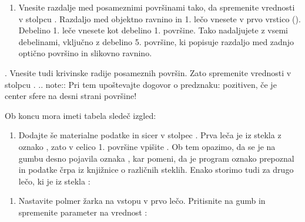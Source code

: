 \documentclass[letterpaper,10pt,english]{sphinxmanual}
\begin{document}
\begin{figure}[htbp]
\centering

\noindent{}
\end{figure}
\begin{enumerate}
%
\setcounter{enumi}{3}
\item {} 
\sphinxAtStartPar
Vnesite razdalje med posameznimi površinami tako, da spremenite vrednosti v stolpcu . Razdaljo med objektno ravnino in 1. lečo vnesete v prvo vrstico (). Debelino 1. leče vnesete kot debelino 1. površine. Tako nadaljujete z vsemi debelinami, vključno z debelino 5. površine, ki popisuje razdaljo med zadnjo optično površino in slikovno ravnino.

\end{enumerate}

. Vnesite tudi krivinske radije posameznih površin. Zato spremenite vrednosti v stolpcu .
.. note::
Pri tem upoštevajte dogovor o predznaku: pozitiven, če je center sfere na desni strani površine!

\sphinxAtStartPar
Ob koncu mora imeti tabela sledeč izgled:

\begin{figure}[htbp]
\centering

\noindent{}
\end{figure}
\begin{enumerate}
%
\setcounter{enumi}{5}
\item {} 
\sphinxAtStartPar
Dodajte še materialne podatke in sicer v stolpec . Prva leča je iz stekla z oznako , zato v celico 1. površine vpišite . Ob tem opazimo, da se je na gumbu desno pojavila oznaka , kar pomeni, da je program oznako prepoznal in podatke črpa iz knjižnice o različnih steklih. Enako storimo tudi za drugo lečo, ki je iz stekla :

\end{enumerate}

\begin{figure}[htbp]
\centering

\noindent{}
\end{figure}
\begin{enumerate}
%
\setcounter{enumi}{6}
\item {} 
\sphinxAtStartPar
Nastavite polmer žarka na vstopu v prvo lečo. Pritisnite na gumb  in spremenite parameter  na vrednost :

\end{enumerate}
\end{document}
